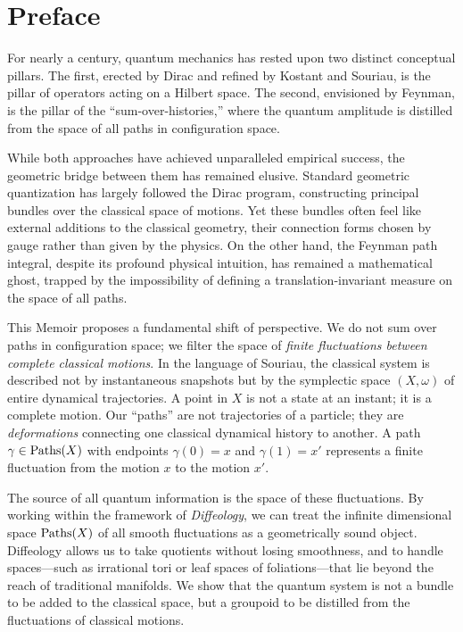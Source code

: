 
\chapter*{Preface}

For nearly a century,
quantum mechanics has rested upon two distinct conceptual pillars.
The first,
erected by Dirac and refined by Kostant and Souriau,
is the pillar of operators acting on a Hilbert space.
The second,
envisioned by Feynman,
is the pillar of the ``sum-over-histories,''
where the quantum amplitude is distilled from the space of all paths in configuration space.

While both approaches have achieved unparalleled empirical success,
the geometric bridge between them has remained elusive.
Standard geometric quantization has largely followed the Dirac program,
constructing principal bundles over the classical space of motions.
Yet these bundles often feel like external additions to the classical geometry,
their connection forms chosen by gauge rather than given by the physics.
On the other hand,
the Feynman path integral,
despite its profound physical intuition,
has remained a mathematical ghost,
trapped by the impossibility of defining a translation-invariant measure on the space of all paths.

This Memoir proposes a fundamental shift of perspective.
We do not sum over paths in configuration space;
we filter the space of \emph{finite fluctuations between complete classical motions}.
In the language of Souriau,
the classical system is described not by instantaneous snapshots
but by the symplectic space $(X,\omega)$ of entire dynamical trajectories.
A point in $X$ is not a state at an instant;
it is a complete motion.
Our ``paths'' are not trajectories of a particle;
they are \emph{deformations} connecting one classical dynamical history to another.
A path $\gamma \in \operatorname{Paths}(X)$ with endpoints $\gamma(0) = x$ and $\gamma(1) = x'$
represents a finite fluctuation from the motion $x$ to the motion $x'$.

The source of all quantum information is the space of these fluctuations.
By working within the framework of \emph{Diffeology},
we can treat the infinite dimensional space $\operatorname{Paths}(X)$ of all smooth fluctuations as a geometrically sound object.
Diffeology allows us to take quotients without losing smoothness,
and to handle spaces---such as irrational tori or leaf spaces of foliations---that lie beyond the reach of traditional manifolds.
We show that the quantum system is not a bundle to be added to the classical space,
but a groupoid to be distilled from the fluctuations of classical motions.

